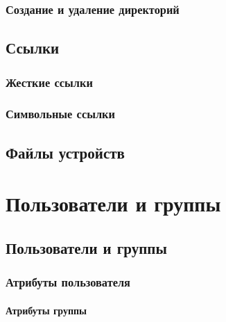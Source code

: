\documentclass[oneside]{book}
\begin{document}
		\section{Создание и удаление директорий}
			
		
		
	\chapter{Ссылки}
	
	
		\section{Жесткие ссылки}
		
		
		\section{Символьные ссылки}
		

	\chapter{Файлы устройств}
	




\part{Пользователи и группы}
%

	\chapter{Пользователи и группы}
	
	
		\section{Атрибуты пользователя}
		
		
			\subsection{Атрибуты группы}
			
		
\end{document}
